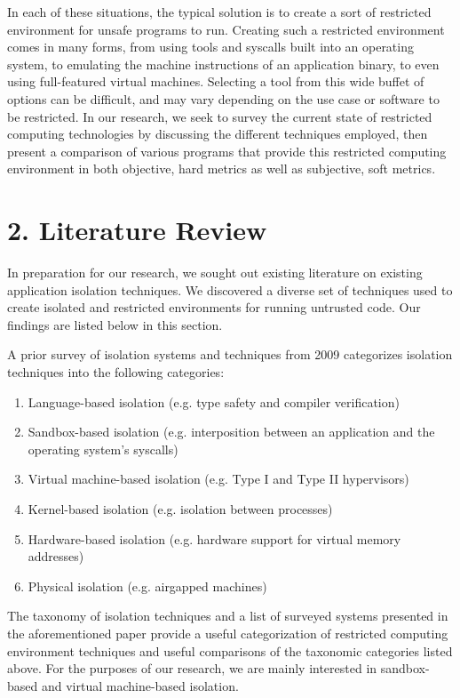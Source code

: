 \documentclass{proc}
\begin{document}
In each of these situations, the typical solution is to create a sort of restricted environment for unsafe programs to run. Creating such a restricted environment comes in many forms, from using tools and syscalls built into an operating system, to emulating the machine instructions of an application binary, to even using full-featured virtual machines. Selecting a tool from this wide buffet of options can be difficult, and may vary depending on the use case or software to be restricted. In our research, we seek to survey the current state of restricted computing technologies by discussing the different techniques employed, then present a comparison of various programs that provide this restricted computing environment in both objective, hard metrics as well as subjective, soft metrics.

\section*{2. Literature Review}

In preparation for our research, we sought out existing literature on existing application isolation techniques. We discovered a diverse set of techniques used to create isolated and restricted environments for running untrusted code. Our findings are listed below in this section.

A prior survey of isolation systems and techniques from 2009 \cite{viswanathan2009isolation} categorizes isolation techniques into the following categories:
\begin{enumerate}
    \item Language-based isolation (e.g. type safety and compiler verification)
    \item Sandbox-based isolation (e.g. interposition between an application and the operating system's syscalls)
    \item Virtual machine-based isolation (e.g. Type I and Type II hypervisors)
    \item Kernel-based isolation (e.g. isolation between processes)
    \item Hardware-based isolation (e.g. hardware support for virtual memory addresses)
    \item Physical isolation (e.g. airgapped machines)
\end{enumerate}
The taxonomy of isolation techniques and a list of surveyed systems presented in the aforementioned paper provide a useful categorization of restricted computing environment techniques and useful comparisons of the taxonomic categories listed above. For the purposes of our research, we are mainly interested in sandbox-based and virtual machine-based isolation.
\end{document}
